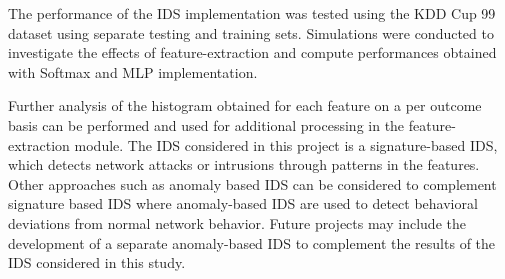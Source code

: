 \documentclass[12pt]{article}
\theoremstyle{definition}
\begin{document}
	The performance of the IDS implementation was tested using the KDD Cup 99 dataset using separate testing and training sets. Simulations were conducted to investigate the effects of feature-extraction and compute performances obtained with Softmax and MLP implementation.
	
	Further analysis of the histogram obtained for each feature on a per outcome basis can be performed and used for additional processing in the feature-extraction module.
	The IDS considered in this project is a signature-based IDS, which detects network attacks or intrusions through patterns in the features. Other approaches such as anomaly based IDS can be considered to complement signature based IDS where anomaly-based IDS are used to detect behavioral deviations from normal network behavior. Future projects may include the development of a separate anomaly-based IDS to complement the results of the IDS considered in this study.
	
	
	\cleardoublepage
	
	
		
	
	
	
	
	
	
	
	
	
	
	
	
	
	
	
	
	
	
	
	
	
\end{document}
